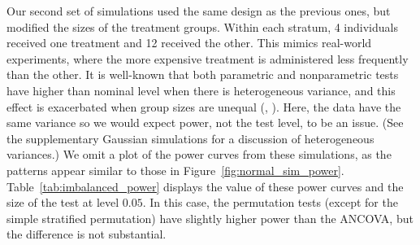 \documentclass[12pt]{article}
\begin{document}
Our second set of simulations used the same design as the previous ones, but modified the sizes of the treatment groups.
Within each stratum, 4 individuals received one treatment and 12 received the other.
This mimics real-world experiments, where the more expensive treatment is administered less frequently than the other.
It is well-known that both parametric and nonparametric tests have higher than nominal level when there is heterogeneous variance, and this effect is exacerbated when group sizes are unequal (\cite{glass_consequences_1972}, \cite{zimmerman_two_2006}).
Here, the data have the same variance so we would expect power, not the test level, to be an issue.
(See the supplementary Gaussian simulations for a discussion of heterogeneous variances.)
We omit a plot of the power curves from these simulations, as the patterns appear similar to those in Figure~\ref{fig:normal_sim_power}.
Table~\ref{tab:imbalanced_power} displays the value of these power curves and the size of the test at level $0.05$.
In this case, the permutation tests (except for the simple stratified permutation) have slightly higher power than the ANCOVA, but the difference is not substantial.
%
\end{document}
